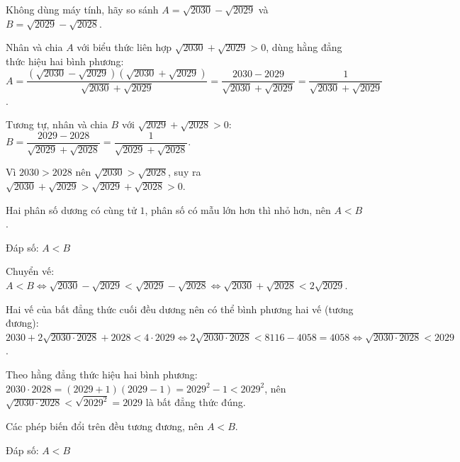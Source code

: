 \begin{problem}[9DS-CAN-028]
Không dùng máy tính, hãy so sánh $A = \sqrt{2030} - \sqrt{2029}$ và $B = \sqrt{2029} - \sqrt{2028}$.

\begin{solution}
Nhân và chia $A$ với biểu thức liên hợp $\sqrt{2030} + \sqrt{2029} > 0$, dùng hằng đẳng thức hiệu hai bình phương: $A = \dfrac{(\sqrt{2030} - \sqrt{2029})(\sqrt{2030} + \sqrt{2029})}{\sqrt{2030} + \sqrt{2029}} = \dfrac{2030 - 2029}{\sqrt{2030} + \sqrt{2029}} = \dfrac{1}{\sqrt{2030} + \sqrt{2029}}$.

Tương tự, nhân và chia $B$ với $\sqrt{2029} + \sqrt{2028} > 0$: $B = \dfrac{2029 - 2028}{\sqrt{2029} + \sqrt{2028}} = \dfrac{1}{\sqrt{2029} + \sqrt{2028}}$.

Vì $2030 > 2028$ nên $\sqrt{2030} > \sqrt{2028}$, suy ra $\sqrt{2030} + \sqrt{2029} > \sqrt{2029} + \sqrt{2028} > 0$.

Hai phân số dương có cùng tử $1$, phân số có mẫu lớn hơn thì nhỏ hơn, nên $A < B$.

Đáp số: $\boxed{A < B}$
\end{solution}

\begin{solution}
Chuyển vế: $A < B \Leftrightarrow \sqrt{2030} - \sqrt{2029} < \sqrt{2029} - \sqrt{2028} \Leftrightarrow \sqrt{2030} + \sqrt{2028} < 2\sqrt{2029}$.

Hai vế của bất đẳng thức cuối đều dương nên có thể bình phương hai vế (tương đương): $2030 + 2\sqrt{2030 \cdot 2028} + 2028 < 4 \cdot 2029 \Leftrightarrow 2\sqrt{2030 \cdot 2028} < 8116 - 4058 = 4058 \Leftrightarrow \sqrt{2030 \cdot 2028} < 2029$.

Theo hằng đẳng thức hiệu hai bình phương: $2030 \cdot 2028 = (2029 + 1)(2029 - 1) = 2029^2 - 1 < 2029^2$, nên $\sqrt{2030 \cdot 2028} < \sqrt{2029^2} = 2029$ là bất đẳng thức đúng.

Các phép biến đổi trên đều tương đương, nên $A < B$.

Đáp số: $\boxed{A < B}$
\end{solution}
\end{problem}

